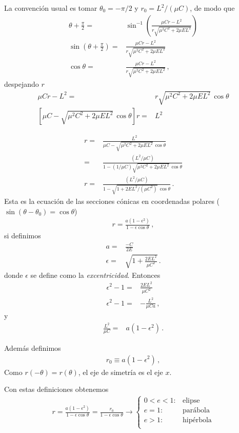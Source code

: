 \begin{frame}
La convención usual es tomar $\theta_0=-\pi/2$ y $r_0=L^2/(\mu C)$, de modo que 
\begin{align}
  \theta+\frac{\pi}{2}=&\sin^{-1}\left(\frac{\mu C r-L^2}{r\sqrt{\mu^2C^2+2\mu E L^2}}\right)\nonumber\\
  \sin\left(\theta+\frac{\pi}{2}\right)=&\frac{\mu C r-L^2}{r\sqrt{\mu^2C^2+2\mu E L^2}}\nonumber\\
  \cos\theta=&\frac{\mu C r-L^2}{r\sqrt{\mu^2C^2+2\mu E L^2}}\,,
\end{align}
despejando $r$
\begin{align}
  \mu C r-L^2=&r\sqrt{\mu^2C^2+2\mu E L^2}\,\cos\theta\nonumber\\
   \left[\mu C -\sqrt{\mu^2C^2+2\mu E L^2}\,\cos\theta\right]r=& L^2
\end{align}

\begin{align}
   r=&\frac{L^2}{\mu C -\sqrt{\mu^2C^2+2\mu E L^2}\,\cos\theta} \nonumber\\
     =&\frac{(L^2/\mu C)}{1 -(1/\mu C)\sqrt{\mu^2C^2+2\mu E L^2}\,\cos\theta} \nonumber\\
    r =&\frac{(L^2/\mu C)}{1 -\sqrt{1+2EL^2/(\mu C^2)}\,\cos\theta}\,.
\end{align}
Esta es la ecuación de las secciones cónicas en coordenadas polares ($\sin(\theta-\theta_0)=\cos\theta$)
\begin{align}
  \label{eq:11}
  r=\frac{a(1-\epsilon^2)}{1-\epsilon\cos\theta}\,,
\end{align}
si definimos
\begin{align}
  \label{eq:17exc}
  a=&\frac{-C}{2E}\nonumber\\
  \epsilon=&\sqrt{1+\frac{2EL^2}{\mu C^2}}\,.
\end{align}
donde $\epsilon$ se define como la \emph{excentricidad}. Entonces
\begin{align}
  \epsilon^2-1=&\frac{2EL^2}{\mu C^2}\nonumber\\
  \epsilon^2-1=&-\frac{L^2}{\mu C a}\,,
\end{align}
y
\begin{align}
\label{eq:LCa}
  \frac{L^2}{\mu C}=&a(1-\epsilon^2)\,.
\end{align}


Además definimos
\begin{align}
  r_0\equiv a(1-\epsilon^2)\,,
\end{align}
Como $r(-\theta)=r(\theta)$, el eje de simetría es el eje $x$.

Con estas definiciones obtenemos
\begin{align}
  \label{eq:conicaspol}
   r=\frac{a(1-\epsilon^2)}{1-\epsilon\cos\theta}
=\frac{r_0}{1-\epsilon\cos\theta}\to
   \begin{cases}
     0<e<1:&\text{elipse}\\
     e=1:& \text{parábola}\\
     e>1:& \text{hipérbola}\\
   \end{cases}
\end{align}
\end{frame}

